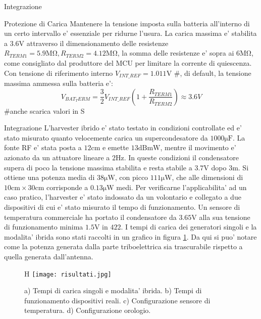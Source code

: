 \begin{section}{Integrazione}
    \begin{subsection}{Protezione di Carica}
        Mantenere la tensione imposta sulla batteria all'interno di un certo intervallo e' essenziale per ridurne l'usura. La carica massima e' stabilita a \(3.6\mathrm{V}\) attraverso il dimensionamento delle resistenze \(R_{TERM1}=5.9\mathrm{M\Omega},R_{TERM2}=4.12\mathrm{M\Omega}\), la somma delle resistenze e' sopra ai \(6\mathrm{M\Omega}\), come consigliato dal produttore del MCU per limitare la corrente di quiescenza. Con tensione di riferimento interno \(V_{INT\_REF}=1.011\mathrm{V}\) \#, di default, la tensione massima ammessa sulla batteria e': 
        \begin{equation*}
            V_{BAT_TERM} = \frac{3}{2}V_{INT\_REF}\left(1+\frac{R_{TERM1}}{R_{TERM2}}\right) \approx 3.6V
        \end{equation*}
        \#anche scarica valori in S
    \end{subsection}

    \begin{subsection}{Integrazione}
        L'harvester ibrido e' stato testato in condizioni controllate ed e' stato misurato quanto velocemente carica un supercondesatore da \(1000\mathrm{\mu F}\). La fonte RF e' stata posta a \(12\mathrm{cm}\) e emette \(13\mathrm{dBmW}\), mentre il movimento e' azionato da un attuatore lineare a \(2\mathrm{Hz}\). In queste condizioni il condensatore supera di poco la tensione massima stabilita e resta stabile a \(3.7\mathrm{V}\) dopo \(3\mathrm{m}\). Si ottiene una potenza media di \(38\mathrm{\mu W}\), con picco \(111\mathrm{\mu W}\), che alle dimensioni di \(10\mathrm{cm}\times30\mathrm{cm}\) corrisponde a \(0.13\mathrm{\mu W}\) medi. Per verificarne l'applicabilita' ad un caso pratico, l'harvester e' stato indossato da un volontario e collegato a due dispositivi di cui e' stato misurato il tempo di funzionamento. Un sensore di temperatura commerciale ha portato il condensatore da \(3.65\mathrm{V}\) alla sua tensione di funzionamento minima \(1.5\mathrm{V}\) in \(42\mathrm{2}\).
        I tempi di carica dei generatori singoli e la modalita' ibrida sono stati raccolti in un grafico in figura \ref{fig:risultati}. Da qui si puo' notare come la potenza generata dalla parte triboelettrica sia trascurabile rispetto a quella generata dall'antenna.

        \begin{figure}{H}
            \texttt{[image: risultati.jpg]}
            \centering
            \caption{a) Tempi di carica singoli e modalita' ibrida. b) Tempi di funzionamento dispositivi reali. c) Configurazione sensore di temperatura. d) Configurazione orologio. \cite{kouWearableAllFabricHybrid2024}}
            \label{fig:risultati}
        \end{figure}


\end{subsection}
\end{section}
